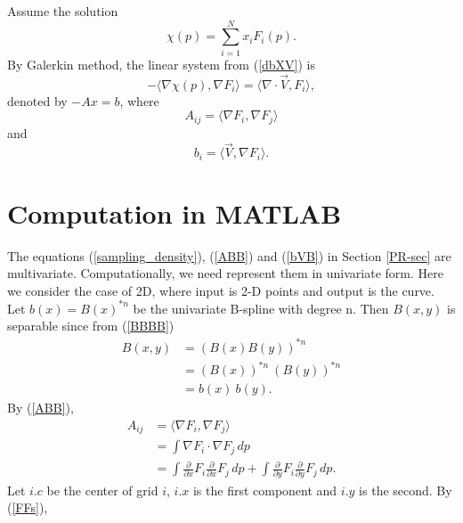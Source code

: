 \documentclass[11pt,twoside]{article}
\begin{document}
Assume the solution 
\begin{equation}\label{XxB}
\chi(p)=\sum_{i=1}^N x_i F_i (p).
\end{equation}
By Galerkin method, the linear system from (\ref{dbXV}) is
\begin{equation}\label{dxBdVB}
-\langle \nabla \chi(p), \nabla F_i \rangle
=\langle \nabla \cdot \vec{V}, F_i \rangle,
\end{equation}
denoted by \(-Ax = b\), where
\begin{equation}\label{ABB}
A_{ij} = \langle \nabla F_i, \nabla F_j \rangle
\end{equation}
and
\begin{equation}\label{bVB}
b_i = \langle \vec V, \nabla F_i \rangle.
\end{equation}

\section{Computation in MATLAB}
The equations (\ref{sampling_density}), (\ref{ABB}) and (\ref{bVB}) in Section \ref{PR-sec} are multivariate.
Computationally, we need represent them in univariate form.
Here we consider the case of 2D, where input is 2-D points and output is the curve.
Let \(b(x)=B(x)^{*n}\) be the univariate B-spline with degree n.
Then \(B(x,y)\) is separable since from (\ref{BBBB})
\begin{equation}\label{Bxy_Bxn_Byn}
\begin{aligned}
B(x,y)
&= (B(x)B(y))^{*n}\\
&= (B(x))^{*n}\ (B(y))^{*n}\\
&= b(x)\ b(y).
\end{aligned}
\end{equation}
By (\ref{ABB}),
\begin{equation}\label{Aij_dFi_dFj}
\begin{aligned}
A_{ij}
&= \langle \nabla F_i, \nabla F_j \rangle\\
&= \int \nabla F_i \cdot \nabla F_j\, dp\\
&= \int \frac{\partial}{\partial x} F_i \frac{\partial}{\partial x}  F_j \, dp
+ \int \frac{\partial}{\partial y} F_i \frac{\partial}{\partial y}  F_j \, dp.
\end{aligned}
\end{equation}
Let \(i.c\) be the center of grid \(i\),
\(i.x\) is the first component and \(i.y\) is the second. 
By (\ref{FFs}),
\end{document}
